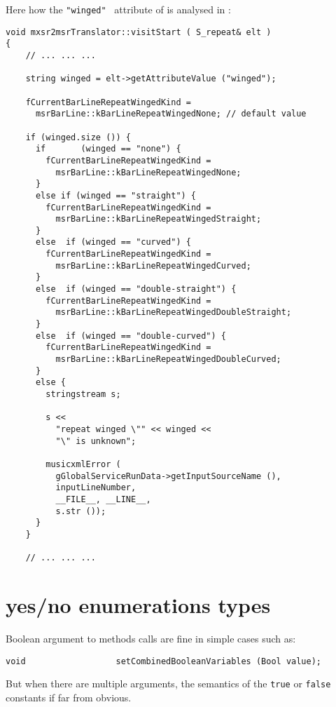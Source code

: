 Here how the {\tt "winged"} \mxml\ attribute of  is analysed in {\tt }:%
\begin{lstlisting}[language=CPlusPlus]
void mxsr2msrTranslator::visitStart ( S_repeat& elt )
{
    // ... ... ...

    string winged = elt->getAttributeValue ("winged");

    fCurrentBarLineRepeatWingedKind =
      msrBarLine::kBarLineRepeatWingedNone; // default value

    if (winged.size ()) {
      if       (winged == "none") {
        fCurrentBarLineRepeatWingedKind =
          msrBarLine::kBarLineRepeatWingedNone;
      }
      else if (winged == "straight") {
        fCurrentBarLineRepeatWingedKind =
          msrBarLine::kBarLineRepeatWingedStraight;
      }
      else  if (winged == "curved") {
        fCurrentBarLineRepeatWingedKind =
          msrBarLine::kBarLineRepeatWingedCurved;
      }
      else  if (winged == "double-straight") {
        fCurrentBarLineRepeatWingedKind =
          msrBarLine::kBarLineRepeatWingedDoubleStraight;
      }
      else  if (winged == "double-curved") {
        fCurrentBarLineRepeatWingedKind =
          msrBarLine::kBarLineRepeatWingedDoubleCurved;
      }
      else {
        stringstream s;

        s <<
          "repeat winged \"" << winged <<
          "\" is unknown";

        musicxmlError (
          gGlobalServiceRunData->getInputSourceName (),
          inputLineNumber,
          __FILE__, __LINE__,
          s.str ());
      }
    }

    // ... ... ...
\end{lstlisting}


\section{yes/no enumerations types}

Boolean argument to methods calls are fine in simple cases such as:
\begin{lstlisting}[language=CPlusPlus]
    void                  setCombinedBooleanVariables (Bool value);
\end{lstlisting}

But when there are multiple arguments, the semantics of the {\tt true} or {\tt false} constants if far from obvious.

